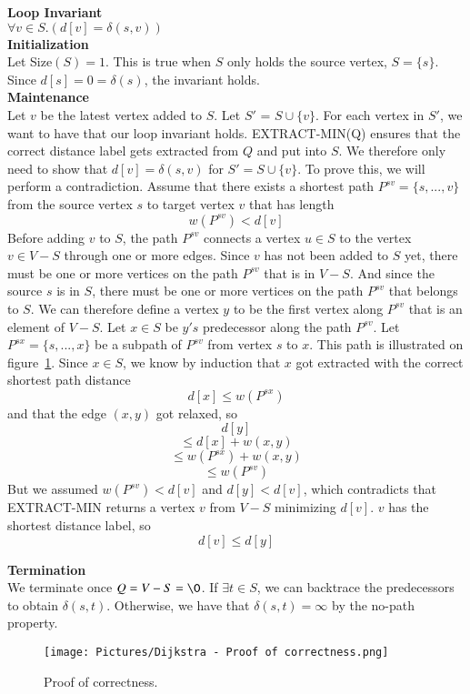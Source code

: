 \documentclass[11pt]{article}
\begin{document}
\noindent \textbf{Loop Invariant}\\
$\forall v\in S.(d[v] = \delta(s,v))$\\

\noindent \textbf{Initialization}\\
Let Size$(S)=1$. This is true when $S$ only holds the source vertex, $S = \{s\}$. Since $d[s]=0=\delta(s)$, the invariant holds.\\

\noindent \textbf{Maintenance}\\
Let $v$ be the latest vertex added to $S$. Let $S'$ = $S \cup \{v\}$. For each vertex in $S'$, we want to have that our loop invariant holds. EXTRACT-MIN(Q) ensures that the correct distance label gets extracted from $Q$ and put into $S$. We therefore only need to show that $d[v]=\delta(s,v)$ for $S'=S \cup \{v\}$. To prove this, we will perform a contradiction. Assume that there exists a shortest path $P^{sv}=\{s, ..., v\}$ from the source vertex $s$ to target vertex $v$ that has length $$w(P^{sv}) < d[v]$$
Before adding $v$ to $S$, the path $P^{sv}$ connects a vertex $u\in S$ to the vertex $v\in V-S$ through one or more edges. Since $v$ has not been added to $S$ yet, there must be one or more vertices on the path $P^{sv}$ that is in $V-S$. And since the source $s$ is in $S$, there must be one or more vertices on the path $P^{sv}$ that belongs to $S$. We can therefore define a vertex $y$ to be the first vertex along $P^{sv}$ that is an element of $V-S$. Let $x\in S$ be $y's$ predecessor along the path $P^{sv}$. Let $P^{sx}=\{s, ..., x\}$ be a subpath of $P^{sv}$ from vertex $s$ to $x$. This path is illustrated on figure~\ref{fig:eyy}. Since $x \in S$, we know by induction that $x$ got extracted with the correct shortest path distance $$d[x] \leq w(P^{sx})$$and that the edge $(x,y)$ got relaxed, so $$d[y]$$$$\leq d[x]+w(x,y)$$$$\leq w(P^{sx}) + w(x,y)$$$$\leq w(P^{sv})$$But we assumed $w(P^{sv}) < d[v]$ and $d[y] < d[v]$, which contradicts that EXTRACT-MIN returns a vertex $v$ from $V-S$ minimizing $d[v]$. $v$ has the shortest distance label, so $$d[v] \leq d[y]$$

\noindent \textbf{Termination}\\
We terminate once $Q = V-S =\O$. If $\exists t \in S$, we can backtrace the predecessors to obtain $\delta(s,t)$. Otherwise, we have that $\delta(s,t) = \infty$ by the no-path property.\\

\begin{figure}[H]
\centering
\texttt{[image: Pictures/Dijkstra - Proof of correctness.png]}
\caption{Proof of correctness.}
\label{fig:eyy}
\end{figure}
\end{document}
